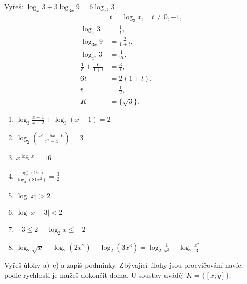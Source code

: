 \documentclass[11pt,a4paper]{article}
\begin{document}
\begin{prikladReseniBox}[title={Příklad 4}]
Vyřeš: $\displaystyle \log_x3+3\log_{3x}9=6\log_{x^2}3$
\tcblower
\[
\begin{aligned}
&t=\log_3x,\quad t\ne0,-1,\\
\log_x3&=\frac1t,\\
\log_{3x}9&=\frac2{1+t},\\
\log_{x^2}3&=\frac1{2t},\\
\frac1t+\frac6{1+t}&=\frac3t,\\
6t&=2(1+t),\\
t&=\frac12,\\
K&=\{\sqrt3\}.
\end{aligned}
\]
\end{prikladReseniBox}
\begin{zadaniBox}[title={Samostatná práce 1}]
\begin{enumerate}[label=\alph*)]
\item $\displaystyle \log_3\frac{x+1}{x-2}+\log_3(x-1)=2$
\item $\displaystyle \log_{2}\!\left(\frac{x^{2} - 5x + 6}{x^{2} - 4}\right) = 3$
\item $\displaystyle x^{\log_2x}=16$
\item $\displaystyle \frac{\log_3^2(9x)}{\log_3(81x^2)}=\frac32$
\item $\displaystyle \log|x|>2$
\item $\displaystyle \log|x-3|<2$
\item $\displaystyle -3\le 2-\log_2x\le-2$
\item $\displaystyle \log_2\sqrt{x}+\log_2(2x^2)-\log_2(3x^3)=\log_2\frac{1}{x^2}+\log_2\frac{x^2}{3}$
\end{enumerate}
\end{zadaniBox}
Vyřeš úlohy a)--e) a zapiš podmínky. Zbývající úlohy jsou procvičování navíc; podle rychlosti je můžeš dokončit doma. U soustav uváděj $K=\{[x;y]\}$. 
\end{document}
